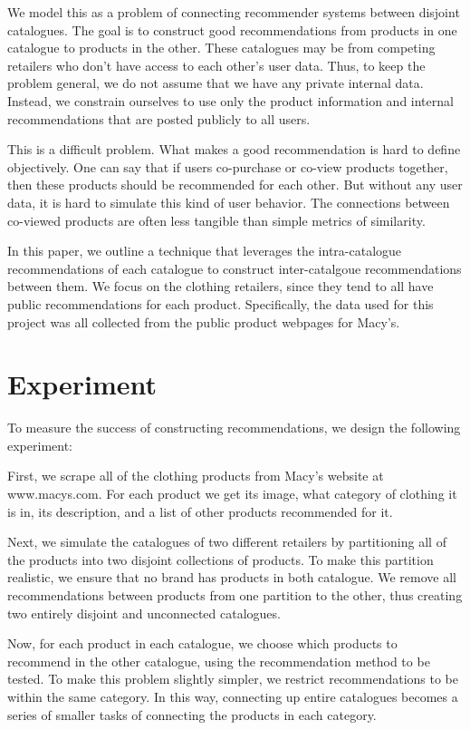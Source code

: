 \documentclass[11pt]{article}
\begin{document}
We model this as a problem of connecting recommender systems between disjoint
catalogues. The goal is to construct good recommendations from products in one
catalogue to products in the other. These catalogues may be from competing 
retailers who don't have access to each other's user data. Thus, to keep the 
problem general, we do not assume that we have any private internal data. 
Instead, we constrain ourselves to use only the product information and internal
recommendations that are posted publicly to all users.

This is a difficult problem. What makes a good recommendation is hard to define
objectively. One can say that if users co-purchase or co-view products together,
then these products should be recommended for each other. But without any user 
data, it is hard to simulate this kind of user behavior. The connections between 
co-viewed products are often less tangible than simple metrics of similarity. 

In this paper, we outline a technique that leverages the intra-catalogue 
recommendations of each catalogue to construct inter-catalgoue recommendations
between them. We focus on the clothing retailers, since they tend to all have
public recommendations for each product. Specifically, the data used for this
project was all collected from the public product webpages for Macy's.

\section*{Experiment}
To measure the success of constructing recommendations, we design the following
experiment:

First, we scrape all of the clothing products from Macy's website at 
www.macys.com. For each product we get its image, what category of clothing it
is in, its description, and a list of other products recommended for it.

Next, we simulate the catalogues of two different retailers by partitioning all
of the products into two disjoint collections of products. To make this
partition realistic, we ensure that no brand has products in both catalogue. We
remove all recommendations between products from one partition to the other,
thus creating two entirely disjoint and unconnected catalogues.

Now, for each product in each catalogue, we choose which products to recommend
in the other catalogue, using the recommendation method to be tested. To make
this problem slightly simpler, we restrict recommendations to be within the same
category. In this way, connecting up entire catalogues becomes a series of
smaller tasks of connecting the products in each category.
\end{document}
